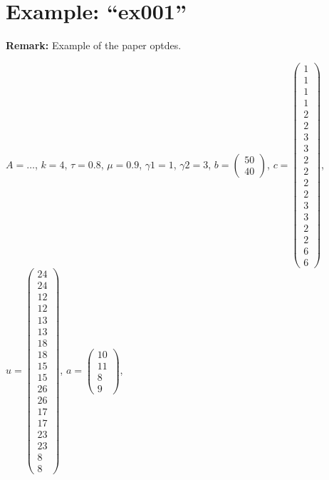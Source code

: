 

\section*{Example: ``ex001''}



\textbf{Remark:} Example of the paper optdes.



\begin{sloppypar}

${A=\dots}$, 
${k=4}$, 
${\tau=0.8}$, 
${\mu=0.9}$, 
${\gamma1=1}$, 
${\gamma2=3}$, 
${b=\begin{pmatrix}
50\\
40
\end{pmatrix}
}$, 
${c=\begin{pmatrix}
1\\
1\\
1\\
1\\
2\\
2\\
3\\
3\\
2\\
2\\
2\\
2\\
3\\
3\\
2\\
2\\
6\\
6
\end{pmatrix}
}$, 
${u=\begin{pmatrix}
24\\
24\\
12\\
12\\
13\\
13\\
18\\
18\\
15\\
15\\
26\\
26\\
17\\
17\\
23\\
23\\
8\\
8
\end{pmatrix}
}$, 
${a=\begin{pmatrix}
10\\
11\\
8\\
9
\end{pmatrix}
}$, 
\end{sloppypar}

